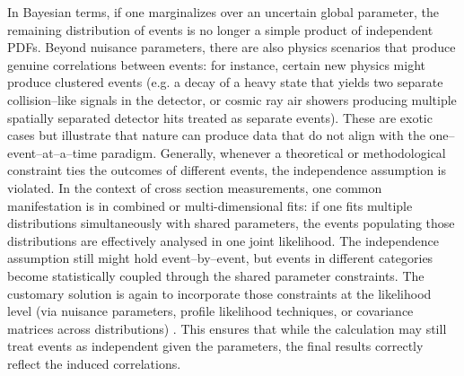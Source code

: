         In Bayesian terms, if one marginalizes over an uncertain global parameter, the remaining distribution of events is no longer a simple product of independent PDFs.
        Beyond nuisance parameters, there are also physics scenarios that produce genuine correlations between events: for instance, certain new physics might produce clustered events (e.g. a decay of a heavy state that yields two separate collision--like signals in the detector, or cosmic ray air showers producing multiple spatially separated detector hits treated as separate events).
        These are exotic cases but illustrate that nature can produce data that do not align with the one--event--at--a--time paradigm.
        Generally, whenever a theoretical or methodological constraint ties the outcomes of different events, the independence assumption is violated.
        In the context of cross section measurements, one common manifestation is in combined or multi-dimensional fits: if one fits multiple distributions simultaneously with shared parameters, the events populating those distributions are effectively analysed in one joint likelihood.
        The independence assumption still might hold event--by--event, but events in different categories become statistically coupled through the shared parameter constraints.
        The customary solution is again to incorporate those constraints at the likelihood level (via nuisance parameters, profile likelihood techniques, or covariance matrices across distributions) .
        This ensures that while the calculation may still treat events as independent given the parameters, the final results correctly reflect the induced correlations.

